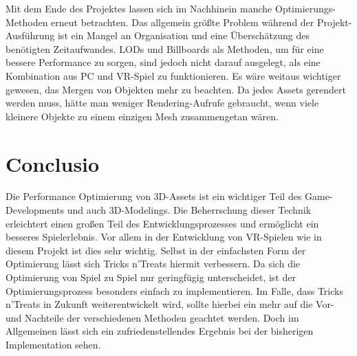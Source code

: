 Mit dem Ende des Projektes lassen sich im Nachhinein manche Optimierungs-Methoden erneut betrachten. Das allgemein größte Problem während der Projekt-Ausführung ist ein Mangel an Organisation und eine Überschätzung des benötigten Zeitaufwandes. LODs und Billboards als Methoden, um für eine bessere Performance zu sorgen, sind jedoch nicht darauf ausgelegt, als eine Kombination aus PC und VR-Spiel zu funktionieren. Es wäre weitaus wichtiger gewesen, das Mergen von Objekten mehr zu beachten. Da jedes Assets gerendert werden muss, hätte man weniger Rendering-Aufrufe gebraucht, wenn viele kleinere Objekte zu einem einzigen Mesh zusammengetan wären.\cite[S.154]{_unity_game_optimization}

\chapter{Conclusio}

Die Performance Optimierung von 3D-Assets ist ein wichtiger Teil des Game-Developments und auch 3D-Modelings. Die Beherrschung dieser Technik erleichtert einen großen Teil des Entwicklungsprozesses und ermöglicht ein besseres Spielerlebnis. Vor allem in der Entwicklung von VR-Spielen wie in diesem Projekt ist dies sehr wichtig. Selbst in der einfachsten Form der Optimierung lässt sich Tricks n’Treats hiermit verbessern. Da sich die Optimierung von Spiel zu Spiel nur geringfügig unterscheidet, ist der Optimierungsprozess besonders einfach zu implementieren. Im Falle, dass Tricks n’Treats in Zukunft weiterentwickelt wird, sollte hierbei ein mehr auf die Vor- und Nachteile der verschiedenen Methoden geachtet werden. Doch im Allgemeinen lässt sich ein zufriedenstellendes Ergebnis bei der bisherigen Implementation sehen.

